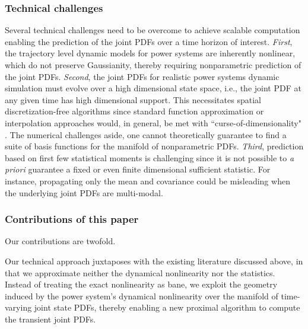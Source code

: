 \documentclass[10pt,twocolumn]{IEEEtran}
\newcommand{\red}{\color{red}}
\begin{document}
\subsubsection{Technical challenges}\label{subsubsec:technicalchallenges}
Several technical challenges need to be overcome to achieve scalable computation enabling the prediction of the joint PDFs over a time horizon of interest. \emph{First}, the trajectory level dynamic models for power systems are inherently nonlinear, which do not preserve Gaussianity, thereby requiring nonparametric prediction of the joint PDFs. \emph{Second}, the joint PDFs for realistic power systems dynamic simulation must evolve over a high dimensional state space, i.e., the joint PDF at any given time has high dimensional support. This necessitates spatial discretization-free algorithms since standard function approximation or interpolation approaches would, in general, be met with ``curse-of-dimensionality" \cite{bellman1957}. The numerical challenges aside, one cannot theoretically guarantee to find a suite of basis functions for the manifold of nonparametric PDFs. \emph{Third}, prediction based on first few statistical moments is challenging since it is not possible to \emph{a priori} guarantee a fixed or even finite dimensional sufficient statistic. For instance, propagating only the mean and covariance could be misleading when the underlying joint PDFs are multi-modal.

\subsubsection{Contributions of this paper}
Our contributions are twofold. {\red{TBD}} 

Our technical approach juxtaposes with the existing literature discussed above, in that we approximate neither the dynamical nonlinearity nor the statistics. Instead of treating the exact nonlinearity as bane, we exploit the geometry induced by the power system's dynamical nonlinearity over the manifold of time-varying joint state PDFs, thereby enabling a new proximal algorithm to compute the transient joint PDFs.
\end{document}
